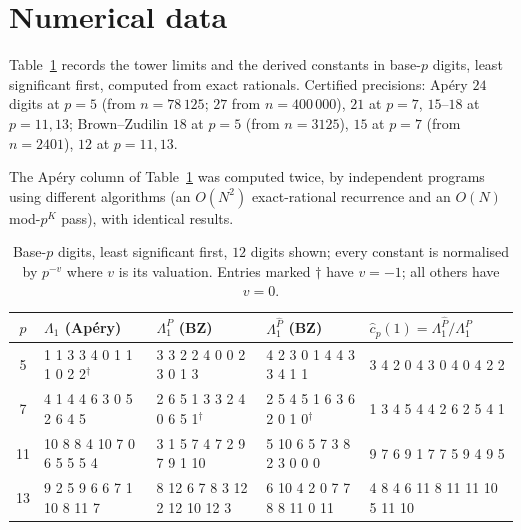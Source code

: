 \documentclass[11pt,reqno]{article}
\newcommand{\Ph}{\widehat{P}}
\newcommand{\Lah}{\Lambda^{\Ph}}
\newcommand{\Lap}{\Lambda^{P}}
\theoremstyle{plain}
\theoremstyle{definition}
\theoremstyle{remark}
\numberwithin{equation}{section}
\begin{document}
\section{Numerical data}\label{app:data}

Table~\ref{tab:constants} records the tower limits and the derived constants in
base-$p$ digits, least significant first, computed from exact rationals.
Certified precisions: Ap\'ery $24$ digits at $p=5$ (from $n=78\,125$; $27$ from
$n=400\,000$), $21$ at $p=7$, $15$--$18$ at $p=11,13$; Brown--Zudilin $18$ at
$p=5$ (from $n=3125$), $15$ at $p=7$ (from $n=2401$), $12$ at $p=11,13$.

The Ap\'ery column of Table~\ref{tab:constants} was computed twice, by
independent programs using different algorithms (an $O(N^2)$ exact-rational
recurrence and an $O(N)$ mod-$p^K$ pass), with identical results.

\begin{table}[h]
\centering\scriptsize
\setlength{\tabcolsep}{3pt}
\caption{Base-$p$ digits, least significant first, $12$ digits shown; every
constant is normalised by $p^{-v}$ where $v$ is its valuation.  Entries marked
$\dagger$ have $v=-1$; all others have $v=0$.}
\label{tab:constants}
\begin{tabular}{@{}cllll@{}}
\toprule
$p$ & $\Lambda_1$ (Ap\'ery) & $\Lap_1$ (BZ) & $\Lah_1$ (BZ) & $\widehat{c}_p(1)=\Lah_1/\Lap_1$\\
\midrule
5 & 1 1 3 3 4 0 1 1 1 0 2 2$^\dagger$ & 3 3 2 2 4 0 0 2 3 0 1 3 & 4 2 3 0 1 4 4 3 3 4 1 1 & 3 4 2 0 4 3 0 4 0 4 2 2\\
7 & 4 1 4 4 6 3 0 5 2 6 4 5 & 2 6 5 1 3 3 2 4 0 6 5 1$^\dagger$ & 2 5 4 5 1 6 3 6 2 0 1 0$^\dagger$ & 1 3 4 5 4 4 2 6 2 5 4 1\\
11 & 10 8 8 4 10 7 0 6 5 5 5 4 & 3 1 5 7 4 7 2 9 7 9 1 10 & 5 10 6 5 7 3 8 2 3 0 0 0 & 9 7 6 9 1 7 7 5 9 4 9 5\\
13 & 9 2 5 9 6 6 7 1 10 8 11 7 & 8 12 6 7 8 3 12 2 12 10 12 3 & 6 10 4 2 0 7 7 8 8 11 0 11 & 4 8 4 6 11 8 11 11 10 5 11 10\\
\bottomrule
\end{tabular}
\end{table}
\end{document}
